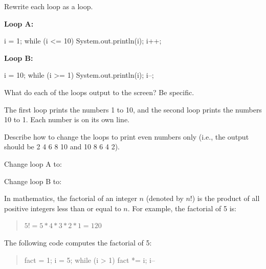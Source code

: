 \newpage


\Q Rewrite each  loop as a  loop.

\begin{multicols}{2}

\textbf{Loop A:}

\begin{answer}[6em]
\begin{javaans}
i = 1;
while (i <= 10) {
    System.out.println(i);
    i++;
}
\end{javaans}
\end{answer}

\columnbreak

\textbf{Loop B:}

\begin{answer}[6em]
\begin{javaans}
i = 10;
while (i >= 1) {
    System.out.println(i);
    i--;
}
\end{javaans}
\end{answer}

\end{multicols}


\Q What do each of the  loops output to the screen? Be specific.

\begin{answer}
The first loop prints the numbers 1 to 10, and the second loop prints the numbers 10 to 1.
Each number is on its own line.
\end{answer}


\Q \label{loophead}
Describe how to change the  loops to print even numbers only (i.e., the output should be 2 4 6 8 10 and 10 8 6 4 2).

\begin{answer}
Change loop A to:~ 

\medskip
Change loop B to:~ 
\end{answer}


\Q In mathematics, the factorial of an integer $n$ (denoted by $n!$) is the product of all positive integers less than or equal to $n$.
For example, the factorial of 5 is:

\begin{quote}
$5! = 5 * 4 * 3 * 2 * 1 = 120$
\end{quote}

The following code computes the factorial of 5:

\begin{quote}
\begin{javalst}
fact = 1;
i = 5;
while (i > 1) {
    fact *= i;
    i--
}
\end{javalst}
\end{quote}

